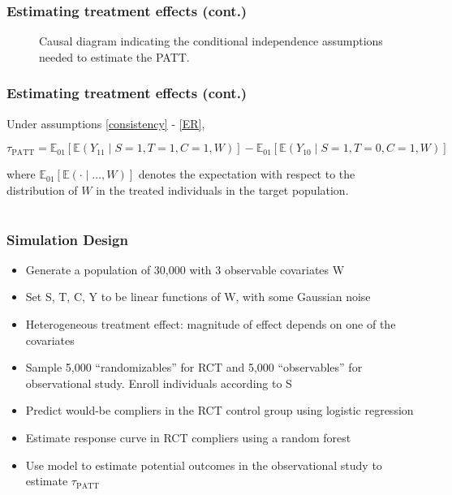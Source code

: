 \documentclass{beamer}
\newcommand{\ex}{\mathbb{E}} %
\begin{document}
\begin{frame}
\frametitle{Estimating treatment effects (cont.)}
\begin{figure}[h]
\caption{Causal diagram indicating the conditional independence assumptions needed to estimate the PATT.}\label{fig:DAG}
\end{figure}

\end{frame}


\begin{frame}
\frametitle{Estimating treatment effects (cont.)}
\begin{theorem}\label{thm1}
\fontsize{9pt}{7.2}\selectfont
Under assumptions \eqref{consistency} - \eqref{ER},

$$\tau_{\text{PATT}} = \ex_{01}\left[  \ex\left(Y_{11} \mid S=1, T=1, C=1, W\right)\right]
-\ex_{01}\left[  \ex\left(Y_{10} \mid S=1, T=0, C=1, W\right) \right] $$

where $\ex_{01}\left[\ex(\cdot \mid\dots, W)\right]$ denotes the expectation with respect to the distribution of $W$ in the treated individuals in the target population.  
\end{theorem}
\end{frame}


\section[Simulation]{}


\begin{frame}
\frametitle{Simulation Design}
\begin{itemize}
\item Generate a population of 30,000 with 3 observable covariates W
\item Set S, T, C, Y to be linear functions of W, with some Gaussian noise
\item Heterogeneous treatment effect: magnitude of effect depends on one of the covariates
\item Sample 5,000 ``randomizables'' for RCT and 5,000 ``observables'' for observational study. Enroll individuals according to S
\item Predict would-be compliers in the RCT control group using logistic regression
\item Estimate response curve in RCT compliers using a random forest
\item Use model to estimate potential outcomes in the observational study to estimate $\tau_{\text{PATT}}$
\end{itemize}
\end{frame}
\end{document}
